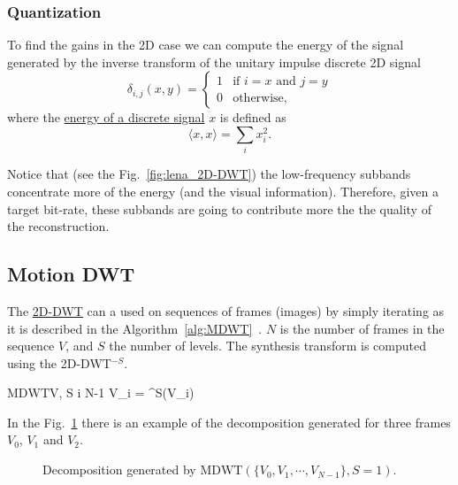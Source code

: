 \subsubsection{Quantization}
To find the gains in the 2D case we can compute the energy of the
signal generated by the inverse transform of the unitary impulse
discrete 2D signal
\begin{equation}
  \delta_{i,j}(x,y) = 
  \left\{
  \begin{array}{ll}
    1 & \text{if $i=x$ and $j=y$}\\
    0 & \text{otherwise},
  \end{array}
  \right.
\end{equation}
where the
\href{https://en.wikipedia.org/wiki/Energy_(signal_processing)}{energy
  of a discrete signal} $x$ is defined as
\begin{equation}
  \langle x, x\rangle =  \sum_{i}{x_i^2}.
\end{equation}

Notice that (see the Fig.~\ref{fig:lena_2D-DWT}) the low-frequency
subbands concentrate more of the energy (and the visual
information). Therefore, given a target bit-rate, these subbands are going to contribute more the the quality of the reconstruction.

\subsection{Motion DWT}

The
\href{https://sistemas-multimedia.github.io/milestones/06-2D-DWT/}{2D-DWT}
can a used on sequences of frames (images) by simply iterating as it
is described in the
Algorithm~\ref{alg:MDWT}~\cite{taubman2002jpeg2000}. $N$ is the number
of frames in the sequence $V$, and $S$ the number of levels. The
synthesis transform is computed using the 2D-DWT$^{-S}$.

\begin{pseudocode}{$\text{MDWT}$}{V, S}
  \label{alg:MDWT}
  \FOR i  \TO N-1 \DO
  V_i = ^S(V_i)
\end{pseudocode}

In the Fig.~\ref{fig:MDWT} there is an example of the decomposition
generated for three frames $V_0$, $V_1$ and $V_2$.

\begin{figure}
  \centering
  \caption{Decomposition generated by $\text{MDWT}(\{V_0, V_1, \cdots, V_{N-1}\}, S=1)$.}
  \label{fig:MDWT}
\end{figure}

